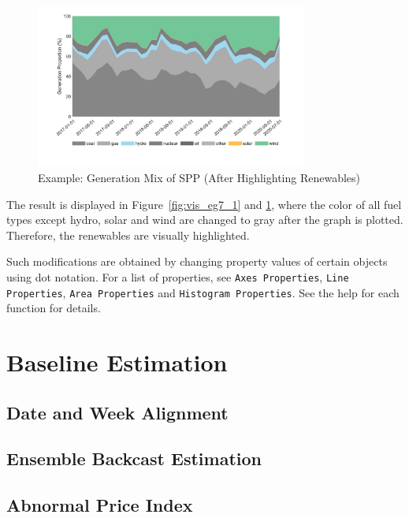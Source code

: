 \documentclass[11pt]{article}
\numberwithin{equation}{section}
\numberwithin{table}{section}
\numberwithin{figure}{section}
\begin{document}
\begin{figure}
  \centering
  \noindent\includegraphics[width=0.8\textwidth]{figures/visualization_example7_2.jpg}
  \caption{Example: Generation Mix of SPP (After Highlighting Renewables)} \label{fig:vis_eg7_2}
\end{figure}

The result is displayed in Figure~\ref{fig:vis_eg7_1} and \ref{fig:vis_eg7_2}, where the color of all fuel types except hydro, solar and wind are changed to gray after the graph is plotted. Therefore, the renewables are visually highlighted.

Such modifications are obtained by changing property values of certain objects using dot notation. For a list of properties, see \verb!Axes Properties!, \verb!Line Properties!, \verb!Area Properties! and \verb!Histogram Properties!. See the help for each function for details.





\newpage
\section{Baseline Estimation} \label{sec:baseline}

\subsection{Date and Week Alignment}

\subsection{Ensemble Backcast Estimation}

\subsection{Abnormal Price Index}
\end{document}
